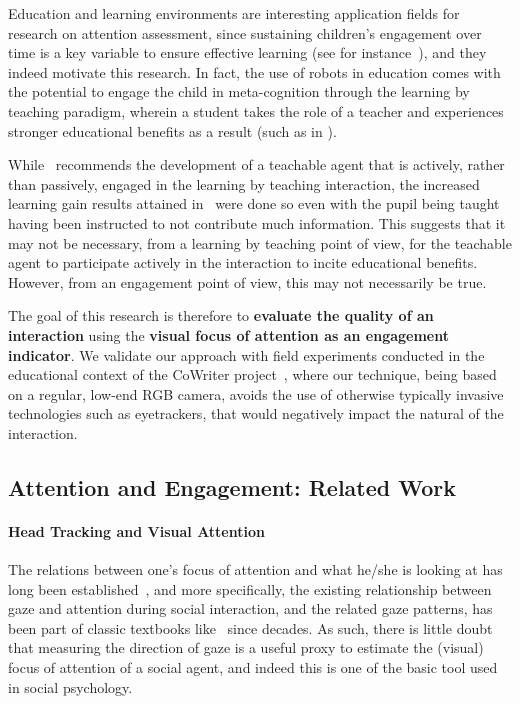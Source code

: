 \documentclass{sig-alternate}
\begin{document}
Education and learning environments are interesting application fields for
research on attention assessment, since sustaining children's engagement over
time is a key variable to ensure effective learning (see for
instance~\cite{Umbach}), and they indeed motivate this research. In fact, the
use of robots in education comes with the potential to engage the child in
meta-cognition through the learning by teaching paradigm, wherein a student
takes the role of a teacher and experiences stronger educational benefits as a
result (such as in \cite{Palinscar1984}).

While~\cite{zhao2012learning} recommends the development of a teachable agent
that is actively, rather than passively, engaged in the learning by teaching
interaction, the increased learning gain results attained
in~\cite{okita2006observation} were done so even with the pupil being taught
having been instructed to not contribute much information. This suggests that it
may not be necessary, from a learning by teaching point of view, for the
teachable agent to participate actively in the interaction to incite educational
benefits. However, from an engagement point of view, this may not necessarily be
true.

The goal of this research is therefore to \textbf{evaluate the quality of an
interaction} using the \textbf{visual focus of attention as an engagement
indicator}. We validate our approach with field experiments conducted in the
educational context of the CoWriter project~\cite{Hood:2015}, where our
technique, being based on a regular, low-end RGB camera, avoids the use of
otherwise typically invasive technologies such as eyetrackers, that would
negatively impact the natural of the interaction.

\subsection*{Attention and Engagement: Related Work}

\paragraph{Head Tracking and Visual Attention}

The relations between one's focus of attention and what he/she is looking at has
long been established~\cite{yarbus1967eye,barber1976perception}, and more
specifically, the existing relationship between gaze and attention during social
interaction, and the related gaze patterns, has been part of classic textbooks
like~\cite{argyle1969social} since decades. As such, there is little doubt that
measuring the direction of gaze is a useful proxy to estimate the (visual) focus
of attention of a social agent, and indeed this is one of the basic tool used in
social psychology.
\end{document}

